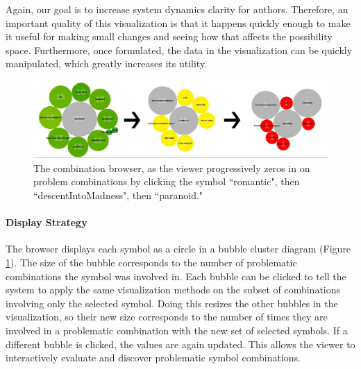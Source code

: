 Again, our goal is to increase system dynamics clarity for authors. Therefore, an important quality of this visualization is that it happens quickly enough to make it useful for making small changes and seeing how that affects the possibility space. Furthermore, once formulated, the data in the visualization can be quickly manipulated, which greatly increases its utility.


\begin{figure}
    \centering
    \includegraphics[width=\textwidth]{figures/2-Ice-Bound/bubble-viz.jpg}
    \caption{The combination browser, as the viewer progressively zeros in on problem combinations by clicking the symbol ``romantic", then ``descentIntoMadness", then ``paranoid."}
    \label{fig:bubble-viz}
\end{figure}


\paragraph{Display Strategy}\label{par:icebound-display-strategy}

The browser displays each symbol as a circle in a bubble cluster diagram (Figure \ref{fig:bubble-viz}). The size of the bubble corresponds to the number of problematic combinations the symbol was involved in. Each bubble can be clicked to tell the system to apply the same visualization methods on the subset of combinations involving only the selected symbol. Doing this resizes the other bubbles in the visualization, so their new size corresponds to the number of times they are involved in a problematic combination with the new set of selected symbols. If a different bubble is clicked, the values are again updated. This allows the viewer to interactively evaluate and discover problematic symbol combinations.

